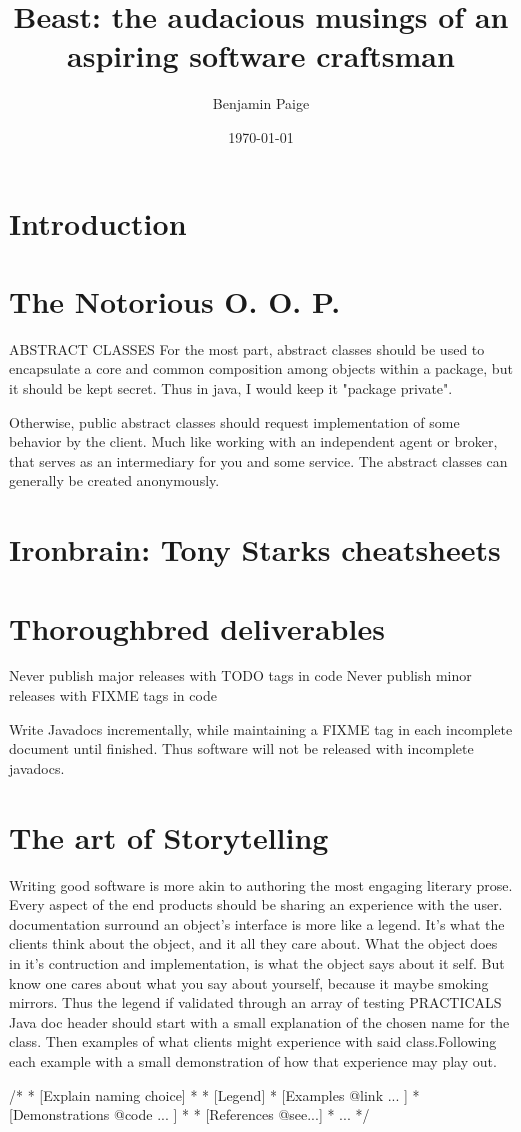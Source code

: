 \documentclass{article}
\title{Beast: the audacious musings of an aspiring software craftsman}
\author{Benjamin Paige}
\date{\today}
\begin{document}
\maketitle

\tableofcontents

\section{Introduction}

\section{The Notorious O. O. P.}
ABSTRACT CLASSES
For the most part, abstract classes should be used to encapsulate a core and common composition among objects within a package, but it should be kept secret.
Thus in java, I would keep it "package private".

Otherwise, public abstract classes should request implementation of some behavior by the client.
Much like working with an independent agent or broker, that serves as an intermediary for you and some service.
The abstract classes can generally be created anonymously. 

\section{Ironbrain: Tony Starks cheatsheets}

\section{Thoroughbred deliverables}
Never publish major releases with TODO tags in code
Never publish minor releases with FIXME tags in code

Write Javadocs incrementally, while maintaining a FIXME tag in each incomplete document until finished. 
Thus software will not be released with incomplete javadocs.

\section{The art of Storytelling}
Writing good software is more akin to authoring the most engaging literary prose. Every aspect of the end products should be sharing an experience with the user.
documentation surround an object's interface is more like a legend.  It's what the clients think about the object, and it all they care about.  What the object does in it's contruction and implementation, is what the object says about it self.  But know one cares about what you say about yourself, because it maybe smoking mirrors.  Thus the legend if validated through an array of testing
PRACTICALS
Java doc header should start with a small explanation of the chosen name for the class.  Then examples of what clients might experience with said class.Following each example with a small demonstration of how that experience may play out.

/*
 * [Explain naming choice]
 *
 * [Legend]
 *		[Examples {@link} ... ]
 *			[Demonstrations {@code} ... ]
 *
 * [References @see...]
 * ...
 */
\end{document}
